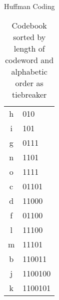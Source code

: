 \documentclass{article}
\numberwithin{table}{section}
\numberwithin{figure}{section}
\begin{document}
\begin{section}{Huffman Coding}
\begin{enumerate}[(a)]
\begin{tcolorbox}
\begin{table}[H]
\begin{tabular}{|c|l|}
                    h & 010 \\
                    i & 101 \\
                    g & 0111 \\
                    n & 1101 \\
                    o & 1111 \\
                    c & 01101 \\
                    d & 11000 \\
                    f & 01100 \\
                    l & 11100 \\
                    m & 11101 \\
                    b & 110011 \\
                    j & 1100100 \\
                    k & 1100101 \\
                \hline
            \end{tabular}
            \caption{Codebook sorted by length of codeword and alphabetic order as tiebreaker}
            \label{tab:p1_3}
        \end{table}
    \end{tcolorbox}
\end{enumerate}
\end{section}

\newpage
\end{document}
